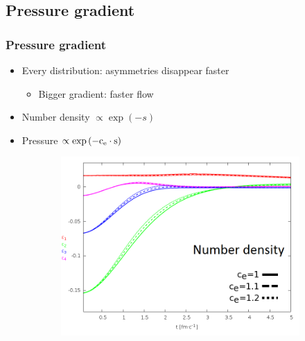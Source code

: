 \documentclass{beamer}
\begin{document}
\begin{frame}
\begin{center}
\begin{figure}[H]
\begin{subfigure}[b]{0.49\textwidth}
	\end{subfigure}
\end{figure}
\end{center}
\end{frame}

\subsection{Pressure gradient}
\begin{frame}
\frametitle{Pressure gradient}
\begin{center}
\begin{itemize}
\setlength{\itemsep}{12pt}
\item<1-> Every distribution: asymmetries disappear faster
\begin{itemize}
\vspace{8pt}
\item<1-> Bigger gradient: faster flow
\end{itemize}
\item<1-> Number density $\propto \exp{(-s)}$
\item<1-> Pressure $\propto \exp{(-\rm{c_e}\cdot s)}$
\end{itemize}
\begin{figure}[H]
	\centering
    \begin{subfigure}[b]{0.49\textwidth}
    		\includegraphics[width=\textwidth]{pic/res/nonrel/eps_ec_r}
	\end{subfigure}
	\begin{subfigure}[b]{0.49\textwidth}

\end{subfigure}
\end{figure}
\end{center}
\end{frame}
\end{document}
